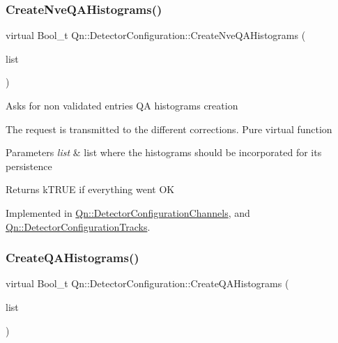 \mbox{\label{classQn_1_1DetectorConfiguration_ade61875d8e7a05dd413c94d6887ae4ac}} 
\subsubsection{\texorpdfstring{Create\+Nve\+Q\+A\+Histograms()}{CreateNveQAHistograms()}}
{\footnotesize\ttfamily virtual Bool\+\_\+t Qn\+::\+Detector\+Configuration\+::\+Create\+Nve\+Q\+A\+Histograms (\begin{DoxyParamCaption}\item[{T\+List $\ast$}]{list }\end{DoxyParamCaption})\hspace{0.3cm}{\ttfamily [pure virtual]}}

Asks for non validated entries QA histograms creation

The request is transmitted to the different corrections. Pure virtual function 
\begin{DoxyParams}{Parameters}
{\em list} & list where the histograms should be incorporated for its persistence \\
\hline
\end{DoxyParams}
\begin{DoxyReturn}{Returns}
k\+T\+R\+UE if everything went OK 
\end{DoxyReturn}


Implemented in \mbox{\hyperlink{classQn_1_1DetectorConfigurationChannels_a62452177f5059e64977c5c1fc079de0b}{Qn\+::\+Detector\+Configuration\+Channels}}, and \mbox{\hyperlink{classQn_1_1DetectorConfigurationTracks_a34818d88b49d67ae71561ffd71c02ec1}{Qn\+::\+Detector\+Configuration\+Tracks}}.

\mbox{\label{classQn_1_1DetectorConfiguration_a9f527d4c584e6bd79b6b8eb0b7f5413a}} 
\subsubsection{\texorpdfstring{Create\+Q\+A\+Histograms()}{CreateQAHistograms()}}
{\footnotesize\ttfamily virtual Bool\+\_\+t Qn\+::\+Detector\+Configuration\+::\+Create\+Q\+A\+Histograms (\begin{DoxyParamCaption}\item[{T\+List $\ast$}]{list }\end{DoxyParamCaption})\hspace{0.3cm}{\ttfamily [pure virtual]}}

